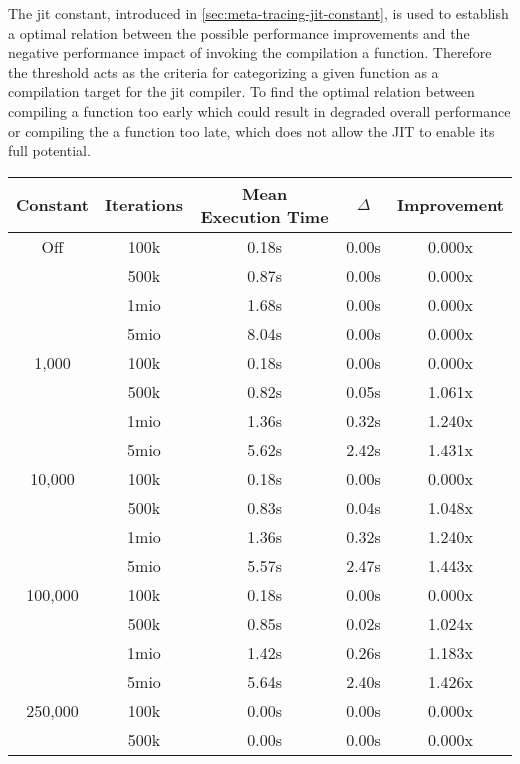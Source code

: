 The jit constant, introduced in \autoref{sec:meta-tracing-jit-constant}, is
used to establish a optimal relation between the possible performance
improvements and the negative performance impact of invoking the compilation a
function. Therefore the threshold acts as the criteria for categorizing a given
function as a compilation target for the jit compiler. To find the optimal
relation between compiling a function too early which could result in degraded
overall performance or compiling the a function too late, which does not allow
the JIT to enable its full potential.


\begin{table}[H]
    \centering
    \begin{tabular}{c|c|c|c|c}
        Constant & Iterations & Mean Execution Time & $\Delta$ & Improvement \\ 
        \hline
        Off         & 100k & 0.18s & 0.00s & 0.000x \\
                    & 500k & 0.87s & 0.00s & 0.000x \\
                    & 1mio & 1.68s & 0.00s & 0.000x \\
                    & 5mio & 8.04s & 0.00s & 0.000x \\
        \hline
        1,000       & 100k & 0.18s & 0.00s & 0.000x \\
                    & 500k & 0.82s & 0.05s & 1.061x \\
                    & 1mio & 1.36s & 0.32s & 1.240x \\
                    & 5mio & 5.62s & 2.42s & 1.431x \\
        \hline
        10,000      & 100k & 0.18s & 0.00s & 0.000x \\
                    & 500k & 0.83s & 0.04s & 1.048x \\
                    & 1mio & 1.36s & 0.32s & 1.240x \\
                    & 5mio & 5.57s & 2.47s & 1.443x \\
        \hline
        100,000     & 100k & 0.18s & 0.00s & 0.000x \\
                    & 500k & 0.85s & 0.02s & 1.024x \\
                    & 1mio & 1.42s & 0.26s & 1.183x \\
                    & 5mio & 5.64s & 2.40s & 1.426x \\
        \hline
        250,000     & 100k & 0.00s & 0.00s & 0.000x \\
                    & 500k & 0.00s & 0.00s & 0.000x \\

\end{tabular}
\end{table}
